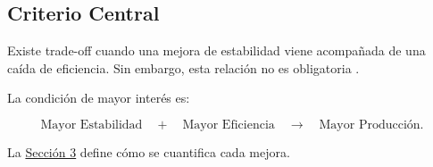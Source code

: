 \subsection{Criterio Central}
\label{subsec:criterio_xy}

Existe trade-off cuando una mejora de estabilidad viene acompañada de una caída
de eficiencia. Sin embargo, esta relación no es obligatoria
\citep{siddiqui_defying_2017,hou_tradeoff_2023}.

La condición de mayor interés es:

\begin{equation}
\text{Mayor Estabilidad}
\quad+\quad
\text{Mayor Eficiencia}
\quad\longrightarrow\quad
\text{Mayor Producción}.
\end{equation}

La \hyperref[sec:metodologia]{Sección 3} define cómo se cuantifica cada mejora.
